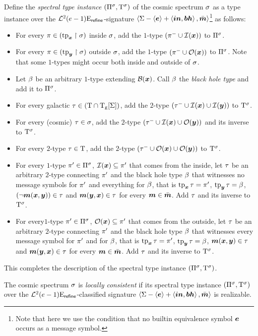 \begin{definition}
Define the \emph{spectral type instance} $(\Pi^{\sigma},\mathrm{T}^{\sigma})$ of the
cosmic spectrum $\sigma$ as a type instance over the $\mathcal{L}^{2}_{{}}{(e-1)}\mathrm{E}_{\mathsf{refine}}$-signature 
$\left\langle \mathrm{\Sigma} - \left\langle \bm{e} \right\rangle + \left\langle \bm{in},\bm{bh} \right\rangle,\bar{\bm{m}} \right\rangle$\footnote{Note that here we use
the condition that no builtin equivalence symbol $\bm{e}$ occurs as a message
symbol.} as follows:
\begin{itemize}
  \item[\sticondI]\label{sti-I}
  For every $\pi \in (\operatorname{tp}_{\bm{x}}\restriction\sigma)$ inside $\sigma$, add the
  $1$-type $(\pi^{-} \cup \mathcal{I}(\bm{x}))$ to $\Pi^{\sigma}$.
  \item[\sticondO]\label{sti-O}
  For every $\pi \in (\operatorname{tp}_{\bm{y}}\restriction\sigma)$ outside $\sigma$, add the
  $1$-type $(\pi^{-} \cup \mathcal{O}(\bm{x}))$ to $\Pi^{\sigma}$. Note that some
  $1$-types might occur both inside and outside of $\sigma$.
  \item[\sticondB]\label{sti-B}
  Let $\beta$ be an arbitrary $1$-type extending $\mathcal{B}(\bm{x})$.
  Call $\beta$ the \emph{black hole type} and add it to $\Pi^{\sigma}$.
  \item[\sticondII]\label{sti-II}
  For every galactic $\tau \in (\mathrm{T} \cap \mathrm{T}_{\mathrm{g}}[\mathrm{\Sigma}])$, add the $2$-type
  $(\tau^{-} \cup \mathcal{I}(\bm{x}) \cup \mathcal{I}(\bm{y}))$ to $\mathrm{T}^{\sigma}$.
  \item[\sticondIO]\label{sti-IO}
  For every (cosmic) $\tau \in \sigma$, add the $2$-type
  $(\tau^{-} \cup \mathcal{I}(\bm{x}) \cup \mathcal{O}(\bm{y}))$ and its inverse to $\mathrm{T}^{\sigma}$.
  \item[\sticondOO]\label{sti-OO}
  For every $2$-type $\tau \in \mathrm{T}$, add the $2$-type
  $(\tau^{-} \cup \mathcal{O}(\bm{x}) \cup \mathcal{O}(\bm{y}))$ to $\mathrm{T}^{\sigma}$.
  \item[\sticondIB]\label{sti-IB}
  For every $1$-type ${\pi'} \in \Pi^{\sigma}$, $\mathcal{I}(\bm{x}) \subseteq {\pi'}$ that
  comes from the inside, let $\tau$ be an arbitrary $2$-type connecting ${\pi'}$ and the black hole type $\beta$ that witnesses no
  message symbols for ${\pi'}$ and everything for $\beta$, that is
  $\operatorname{tp}_{\bm{x}}\tau = {\pi'}$, $\operatorname{tp}_{\bm{y}}\tau = \beta$, $(\lnot\bm{m}(\bm{x},\bm{y})) \in \tau$ and
  $\bm{m}(\bm{y},\bm{x}) \in \tau$ for every $\bm{m} \in \bar{\bm{m}}$. Add $\tau$ and its inverse
  to $\mathrm{T}^{\sigma}$.
  \item[\sticondOB]\label{sti-OB}
  For every$1$-type ${\pi'} \in \Pi^{\sigma}$, $\mathcal{O}(\bm{x}) \subseteq {\pi'}$
  that comes from the outside, let $\tau$ be an arbitrary $2$-type connecting
  ${\pi'}$ and the black hole type $\beta$ that witnesses every message symbol for ${\pi'}$ and for $\beta$, that is
  $\operatorname{tp}_{\bm{x}}\tau = {\pi'}$, $\operatorname{tp}_{\bm{y}}\tau = \beta$, $\bm{m}(\bm{x},\bm{y}) \in \tau$ and
  $\bm{m}(\bm{y},\bm{x}) \in \tau$ for every $\bm{m} \in \bar{\bm{m}}$. Add $\tau$ and its inverse
  to $\mathrm{T}^{\sigma}$.
\end{itemize}
This completes the description of the spectral type instance
$(\Pi^{\sigma},\mathrm{T}^{\sigma})$.

The cosmic spectrum $\sigma$ is \emph{locally consistent} if its spectral type
instance $(\Pi^{\sigma},\mathrm{T}^{\sigma})$ over the
$\mathcal{L}^{2}_{{}}{(e-1)}\mathrm{E}_{\mathsf{refine}}$-classified signature
$\left\langle \mathrm{\Sigma} - \left\langle \bm{e} \right\rangle + \left\langle \bm{in}, \bm{bh} \right\rangle,\bar{\bm{m}} \right\rangle$ is realizable.
\end{definition}

